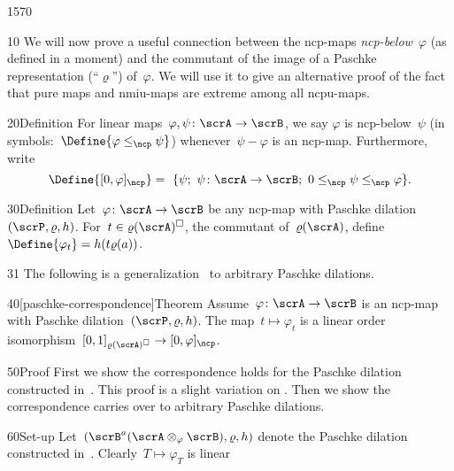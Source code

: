 \begin{parsec}{1570}%
\begin{point}{10}%
We will now prove a useful connection between
    the ncp-maps \emph{ncp-below}~$\varphi$ (as defined in a moment)
    and the commutant of the image
    of a Paschke representation (``$\varrho$'') of~$\varphi$.
We will use it to give an alternative proof
    of the fact that pure maps and nmiu-maps
    are extreme among all ncpu-maps.
\end{point}
\begin{point}{20}{Definition}%
For linear  maps~$\varphi, \psi\colon \scrA \to \scrB$,
    we say $\varphi$ is ncp-below~$\psi$
    (in symbols:~$\Define{\varphi \mathrel{\leq_\ncp} \psi}$\index{$\leq_\ncp$})
    whenever~$\psi - \varphi$ is an ncp-map.
    Furthermore, write
    \begin{equation*}
        \Define{[0,\varphi]_\ncp}\index{$[0,\varphi]_\ncp$} =\  
        \{\psi; \ \psi \colon \scrA \to \scrB;
            \ 0 \leq_\ncp\psi \leq_\ncp \varphi \}.
    \end{equation*}
\end{point}
\spacingfix{}
\begin{point}{30}{Definition}%
    Let~$\varphi\colon \scrA \to \scrB$ be any ncp-map with Paschke
        dilation~$(\scrP, \varrho, h)$.
        For~$t \in \varrho(\scrA)^\square$, the commutant of~$\varrho(\scrA)$,
        define $\Define{\varphi_t}\index{$\varphi_t$} = h(t \varrho(a))$.
\end{point}
\begin{point}{31}%
The following is a generalization~\cite[prop.~5.4]{paschke}
    to arbitrary Paschke dilations.
\end{point}
\begin{point}{40}[paschke-correspondence]{Theorem}%
Assume~$\varphi\colon \scrA \to \scrB$ is an ncp-map
    with Paschke dilation~$(\scrP, \varrho, h)$.
The map~$t \mapsto \varphi_t$ is a linear
order isomorphism~$[0,1]_{\varrho(\scrA)^\square} \to [0,\varphi]_\ncp$.
\begin{point}{50}{Proof}
First we show the correspondence holds
    for the Paschke dilation constructed in~.
This proof is a slight variation on \cite[prop.~5.4]{paschke}.
Then we show the correspondence carries over to arbitrary Paschke dilations.
\begin{point}{60}{Set-up}%
Let~$(\scrB^a(\scrA \otimes_\varphi \scrB), \varrho, h)$
    denote the Paschke dilation constructed in~.
Clearly~$T \mapsto \varphi_T$ is linear

\end{point}
\end{point}
\end{point}
\end{parsec}
